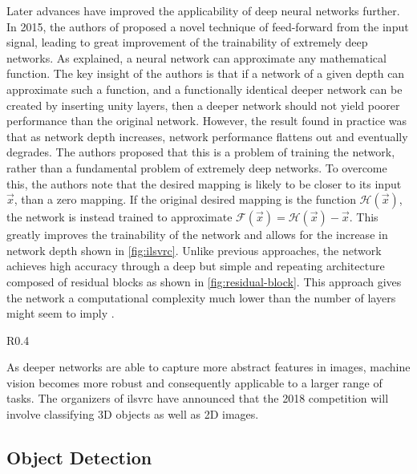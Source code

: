 \documentclass[\rootfolder/main.tex]{subfiles}
\begin{document}
Later advances have improved the applicability of deep neural networks further.
In 2015, the authors of \cite{He2016} proposed a novel technique of feed-forward from the input signal, leading to great improvement of the trainability of extremely deep networks.
As explained, a neural network can approximate any mathematical function.
The key insight of the authors is that if a network of a given depth can approximate such a function, and a functionally identical deeper network can be created by inserting unity layers, then a deeper network should not yield poorer performance than the original network.
However, the result found in practice was that as network depth increases, network performance flattens out and eventually degrades.
The authors proposed that this is a problem of training the network, rather than a fundamental problem of extremely deep networks.
To overcome this, the authors note that the desired mapping is likely to be closer to its input $\vec{x}$, than a zero mapping.
If the original desired mapping is the function $\mathcal{H}(\vec{x})$, the network is instead trained to approximate $\mathcal{F}(\vec{x}) = \mathcal{H}(\vec{x}) - \vec{x}$.
This greatly improves the trainability of the network and allows for the increase in network depth shown in \cref{fig:ilsvrc}.
Unlike previous approaches, the network achieves high accuracy through a deep but simple and repeating architecture composed of residual blocks as shown in \cref{fig:residual-block}.
This approach gives the network a computational complexity much lower than the number of layers might seem to imply \cite{He2016}.

\begin{wrapfigure}{R}{0.4\columnwidth}
    \caption[Residual block]{Residual block \cite{He2016}.\label{fig:residual-block}}
\end{wrapfigure}

As deeper networks are able to capture more abstract features in images, machine vision becomes more robust and consequently applicable to a larger range of tasks.
The organizers of \acrshort{ilsvrc} have announced that the 2018 competition will involve classifying 3D objects as well as 2D images.


\subsection{Object Detection}
\end{document}
